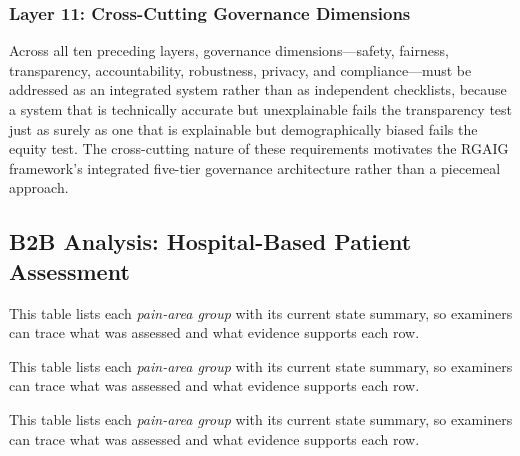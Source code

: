 \subsubsection{Layer 11: Cross-Cutting Governance Dimensions}

Across all ten preceding layers, governance dimensions---safety, fairness, transparency, accountability, robustness, privacy, and compliance---must be addressed as an integrated system rather than as independent checklists, because a system that is technically accurate but unexplainable fails the transparency test just as surely as one that is explainable but demographically biased fails the equity test. The cross-cutting nature of these requirements motivates the RGAIG framework's integrated five-tier governance architecture rather than a piecemeal approach.
\fi %

\subsection{B2B Analysis: Hospital-Based Patient Assessment}
\label{sec:b2b_analysis}
\label{sec:asis_hospital}


\noindent This table lists each \textit{pain-area group} with its current state summary, so examiners can trace what was assessed and what evidence supports each row.



\noindent This table lists each \textit{pain-area group} with its current state summary, so examiners can trace what was assessed and what evidence supports each row.


\noindent This table lists each \textit{pain-area group} with its current state summary, so examiners can trace what was assessed and what evidence supports each row.



